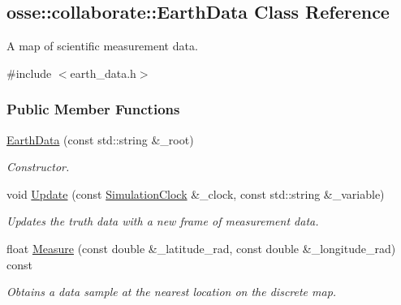 \hypertarget{classosse_1_1collaborate_1_1_earth_data}{}\subsection{osse\+:\+:collaborate\+:\+:Earth\+Data Class Reference}
\label{classosse_1_1collaborate_1_1_earth_data}


A map of scientific measurement data.  




{\ttfamily \#include $<$earth\+\_\+data.\+h$>$}

\subsubsection*{Public Member Functions}
\begin{DoxyCompactItemize}
\item 
\hyperlink{classosse_1_1collaborate_1_1_earth_data_a77ce398a29306b84cdddbd937cb62bbd}{Earth\+Data} (const std\+::string \&\+\_\+root)
\begin{DoxyCompactList}\small\item\em Constructor. \end{DoxyCompactList}\item 
void \hyperlink{classosse_1_1collaborate_1_1_earth_data_a22d7fe03f04f1b3b10020271b16dec5c}{Update} (const \hyperlink{classosse_1_1collaborate_1_1_simulation_clock}{Simulation\+Clock} \&\+\_\+clock, const std\+::string \&\+\_\+variable)
\begin{DoxyCompactList}\small\item\em Updates the truth data with a new frame of measurement data. \end{DoxyCompactList}\item 
float \hyperlink{classosse_1_1collaborate_1_1_earth_data_a39c94ce236efd3ddb85e6108205a7067}{Measure} (const double \&\+\_\+latitude\+\_\+rad, const double \&\+\_\+longitude\+\_\+rad) const
\begin{DoxyCompactList}\small\item\em Obtains a data sample at the nearest location on the discrete map. \end{DoxyCompactList}\end{DoxyCompactItemize}
